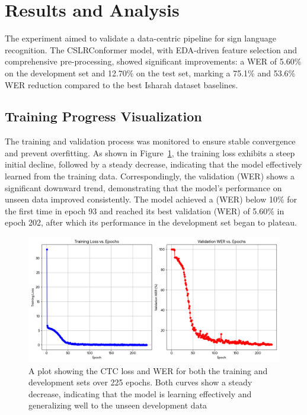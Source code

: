 \section{Results and Analysis}
\label{sec:Results_and_Analysis}

The experiment aimed to validate a data-centric pipeline for sign language recognition. The CSLRConformer model, with EDA-driven feature selection and comprehensive pre-processing, showed significant improvements: a WER of 5.60\% on the development set and 12.70\% on the test set, marking a 75.1\% and 53.6\% WER reduction compared to the best Isharah dataset baselines.


\subsection{Training Progress Visualization}
The training and validation process was monitored to ensure stable convergence and prevent overfitting. As shown in Figure~\ref{fig:training_progress}, the training loss exhibits a steep initial decline, followed by a steady decrease, indicating that the model effectively learned from the training data. Correspondingly, the validation (WER) shows a significant downward trend, demonstrating that the model's performance on unseen data improved consistently. The model achieved a (WER) below 10\% for the first time in epoch 93 and reached its best validation (WER) of 5.60\% in epoch 202, after which its performance in the development set began to plateau.

\begin{figure}
    \centering
    \includegraphics[width=1\linewidth]{WER Loss.png}
    \caption{A plot showing the CTC loss and WER for both the training and development sets over 225 epochs. Both curves show a steady decrease, indicating that the model is learning effectively and generalizing well to the unseen development data}
    \label{fig:training_progress}
\end{figure}


